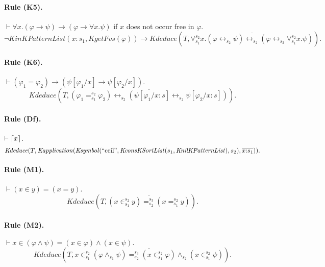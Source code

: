 \documentclass[UTF8,11pt]{article}
\theoremstyle{plain}
\theoremstyle{definition}
\theoremstyle{remark}
\newcommand{\cln}{{:}}
\DeclarePairedDelimiter{\ceil}{\lceil}{\rceil}
\newcommand{\Ksymbol}{\mathit{Ksymbol}}
\newcommand{\KnilKPatternList}{\mathit{KnilKPatternList}}
\newcommand{\KinKPatternList}{\mathit{KinKPatternList}}
\newcommand{\KconsKSortList}{\mathit{KconsKSortList}}
\newcommand{\Kapplication}{\mathit{Kapplication}}
\newcommand{\KgetFvs}{\mathit{KgetFvs}}
\newcommand{\Kdeduce}{\mathit{Kdeduce}}
\newcommand{\quot}[1]{\mathrm{``#1"}}
\begin{document}
\paragraph{Rule (K5).}
$\vdash \forall x . (\varphi \to \psi) \to (\varphi \to \forall x . \psi)$ if $x$ does not occur free in $\varphi$. 
\begin{equation*}
\neg\KinKPatternList(\overline{x \cln s_1}, \KgetFvs(\varphi))
\to \Kdeduce(T, \overline{\forall_{s_1}^{s_2} x . (\varphi \leftrightarrow_{s_2} \psi) \leftrightarrow_{s_2} (\varphi \leftrightarrow_{s_2} \forall_{s_1}^{s_2} x . \psi)}).
\end{equation*}

\paragraph{Rule (K6).}
$\vdash (\varphi_1 = \varphi_2) \to (\psi[\varphi_1/x] \to \psi[\varphi_2/x])$.
\begin{equation*}
\Kdeduce(T, \overline{(\varphi_1 =_{s_1}^{s_2} \varphi_2) \leftrightarrow_{s_2} (\psi[\varphi_1/x \cln s] \leftrightarrow_{s_2} \psi[\varphi_2/x \cln s])}).
\end{equation*}

\paragraph{Rule (Df).}
$\vdash \ceil{x}$.
\begin{equation*}
\Kdeduce(T, \Kapplication(\Ksymbol(\quot{ceil}, \KconsKSortList(s_1, \KnilKPatternList), s_2), \overline{x \cln s_1})).
\end{equation*}

\paragraph{Rule (M1).}
$\vdash (x \in y) = (x = y)$.
\begin{equation*}
\Kdeduce(T, \overline{(x \in_{s_1}^{s_2} y) =_{s_2}^{s_3} (x =_{s_1}^{s_2} y)}).
\end{equation*}

\paragraph{Rule (M2).}
$\vdash x \in (\varphi \wedge \psi) = (x \in \varphi) \wedge (x \in \psi).$
\begin{equation*}
\Kdeduce(T, \overline{x \in_{s_1}^{s_2} (\varphi \wedge_{s_1} \psi) =_{s_2}^{s_3} (x \in_{s_1}^{s_2} \varphi) \wedge_{s_2} (x \in_{s_1}^{s_2} \psi)}).
\end{equation*}
\end{document}
